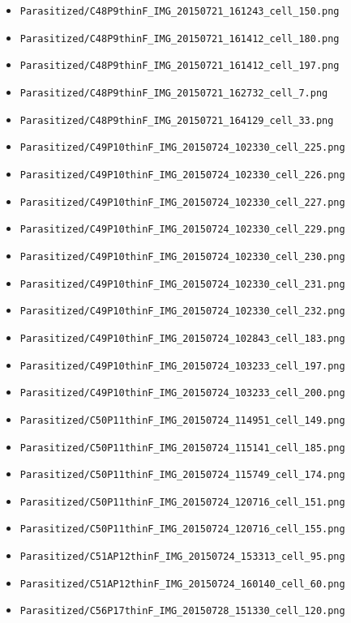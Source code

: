 \begin{itemize}
\item \texttt{Parasitized/C48P9thinF\_IMG\_20150721\_161243\_cell\_150.png}
\item \texttt{Parasitized/C48P9thinF\_IMG\_20150721\_161412\_cell\_180.png}
\item \texttt{Parasitized/C48P9thinF\_IMG\_20150721\_161412\_cell\_197.png}
\item \texttt{Parasitized/C48P9thinF\_IMG\_20150721\_162732\_cell\_7.png}
\item \texttt{Parasitized/C48P9thinF\_IMG\_20150721\_164129\_cell\_33.png}
\item \texttt{Parasitized/C49P10thinF\_IMG\_20150724\_102330\_cell\_225.png}
\item \texttt{Parasitized/C49P10thinF\_IMG\_20150724\_102330\_cell\_226.png}
\item \texttt{Parasitized/C49P10thinF\_IMG\_20150724\_102330\_cell\_227.png}
\item \texttt{Parasitized/C49P10thinF\_IMG\_20150724\_102330\_cell\_229.png}
\item \texttt{Parasitized/C49P10thinF\_IMG\_20150724\_102330\_cell\_230.png}
\item \texttt{Parasitized/C49P10thinF\_IMG\_20150724\_102330\_cell\_231.png}
\item \texttt{Parasitized/C49P10thinF\_IMG\_20150724\_102330\_cell\_232.png}
\item \texttt{Parasitized/C49P10thinF\_IMG\_20150724\_102843\_cell\_183.png}
\item \texttt{Parasitized/C49P10thinF\_IMG\_20150724\_103233\_cell\_197.png}
\item \texttt{Parasitized/C49P10thinF\_IMG\_20150724\_103233\_cell\_200.png}
\item \texttt{Parasitized/C50P11thinF\_IMG\_20150724\_114951\_cell\_149.png}
\item \texttt{Parasitized/C50P11thinF\_IMG\_20150724\_115141\_cell\_185.png}
\item \texttt{Parasitized/C50P11thinF\_IMG\_20150724\_115749\_cell\_174.png}
\item \texttt{Parasitized/C50P11thinF\_IMG\_20150724\_120716\_cell\_151.png}
\item \texttt{Parasitized/C50P11thinF\_IMG\_20150724\_120716\_cell\_155.png}
\item \texttt{Parasitized/C51AP12thinF\_IMG\_20150724\_153313\_cell\_95.png}
\item \texttt{Parasitized/C51AP12thinF\_IMG\_20150724\_160140\_cell\_60.png}
\item \texttt{Parasitized/C56P17thinF\_IMG\_20150728\_151330\_cell\_120.png}

\end{itemize}
